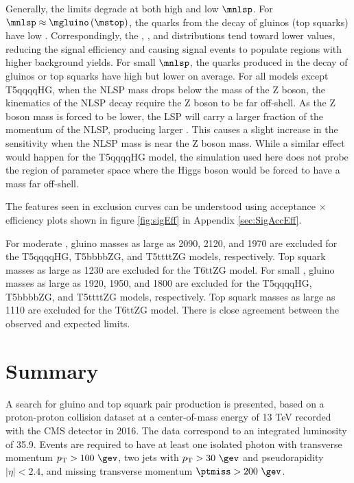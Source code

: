 Generally, the limits degrade at both high and low $\mnlsp$.
For $\mnlsp\approx \mgluino\,(\mstop)$, the quarks from the decay of gluinos (top squarks) have low \pt.
Correspondingly, the \htg, \nj, and \nb distributions tend toward lower values, reducing the signal efficiency and causing
signal events to populate regions with higher background yields. For small $\mnlsp$,
the quarks produced in the decay of gluinos or top squarks have high \pt but lower \ptmiss on average.
For all models except T5qqqqHG, when the NLSP mass drops below the mass of the
Z boson, the kinematics of the NLSP decay require the Z boson to be far off-shell.
As the Z boson mass is forced to be lower, the LSP will carry a larger fraction of the momentum of the NLSP, producing larger \ptmiss.
This causes a slight increase in the sensitivity when the NLSP mass is near the Z boson mass.
While a similar effect would happen for the T5qqqqHG model,
the simulation used here does not probe the region of parameter space where the Higgs boson
would be forced to have a mass far off-shell.

The features seen in exclusion curves can be understood using acceptance $\times$ efficiency plots shown in figure \ref{fig:sigEff} in Appendix \ref{sec:SigAccEff}.

\begin{sloppypar} For moderate \mnlsp, gluino masses as large as 2090, 2120, and 1970 \GeV are excluded for the T5qqqqHG, T5bbbbZG, and T5ttttZG models, respectively.
Top squark masses as large as 1230 \GeV are excluded for the T6ttZG model.
For small \mnlsp, gluino masses as large as 1920, 1950, and 1800 \GeV are excluded for the T5qqqqHG, T5bbbbZG, and T5ttttZG models, respectively.
Top squark masses as large as 1110 \GeV are excluded for the T6ttZG model.
There is close agreement between the observed and expected limits.
\end{sloppypar}

\section{Summary}
\label{sec:summary}

\begin{sloppypar} A search for gluino and top squark pair production is presented, based on a proton-proton collision
dataset at a center-of-mass energy of 13 TeV recorded with the CMS detector in 2016.
The data correspond to an integrated luminosity of 35.9\fbinv.  Events are
required to have at least one
isolated photon with transverse momentum ${\pt>100\ \gev}$, two jets with ${\pt>30\ \gev}$ and pseudorapidity ${|\eta|<2.4}$,
and missing transverse momentum ${\ptmiss>200\ \gev}$.
\end{sloppypar}

